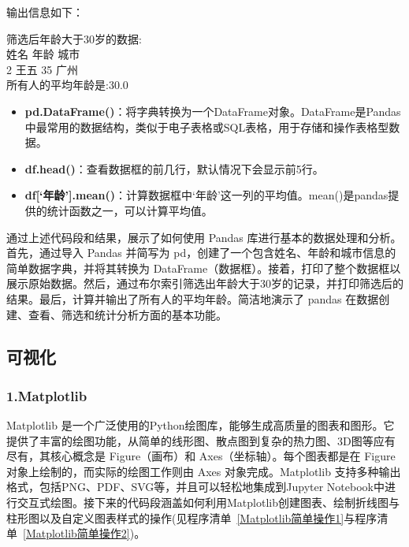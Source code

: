 输出信息如下：
\vspace{-3mm} %
\begin{tcolorbox}[colframe=blue!50!black, colback=blue!10!white, coltitle=black, sharp corners, top=0mm, bottom=0mm, boxrule=0.8mm]
筛选后年龄大于30岁的数据:\\
   姓名  年龄  城市 \\
2  王五  35  广州   \\

所有人的平均年龄是:30.0
\end{tcolorbox}
\vspace{-3mm} %
\begin{itemize}
    \item \textbf{pd.DataFrame()}：将字典转换为一个DataFrame对象。DataFrame是Pandas中最常用的数据结构，类似于电子表格或SQL表格，用于存储和操作表格型数据。
    \item \textbf{df.head()}：查看数据框的前几行，默认情况下会显示前5行。
    \item \textbf{df[‘年龄’].mean()}：计算数据框中‘年龄’这一列的平均值。mean()是pandas提供的统计函数之一，可以计算平均值。
\end{itemize}
通过上述代码段和结果，展示了如何使用 Pandas 库进行基本的数据处理和分析。首先，通过导入 Pandas 并简写为 pd，创建了一个包含姓名、年龄和城市信息的简单数据字典，并将其转换为 DataFrame（数据框）。接着，打印了整个数据框以展示原始数据。然后，通过布尔索引筛选出年龄大于30岁的记录，并打印筛选后的结果。最后，计算并输出了所有人的平均年龄。简洁地演示了 pandas 在数据创建、查看、筛选和统计分析方面的基本功能。



\subsection{可视化}

\subsubsection{1.Matplotlib}

Matplotlib 是一个广泛使用的Python绘图库，能够生成高质量的图表和图形。它提供了丰富的绘图功能，从简单的线形图、散点图到复杂的热力图、3D图等应有尽有，其核心概念是 Figure（画布）和 Axes（坐标轴）。每个图表都是在 Figure 对象上绘制的，而实际的绘图工作则由 Axes 对象完成。Matplotlib 支持多种输出格式，包括PNG、PDF、SVG等，并且可以轻松地集成到Jupyter Notebook中进行交互式绘图。接下来的代码段涵盖如何利用Matplotlib创建图表、绘制折线图与柱形图以及自定义图表样式的操作(见程序清单~\ref{Matplotlib简单操作1}与程序清单~\ref{Matplotlib简单操作2})。

